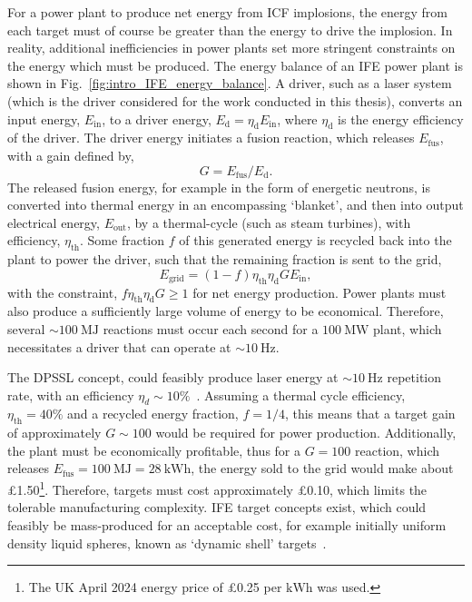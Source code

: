 For a power plant to produce net energy from \ac{ICF} implosions, the energy from each target must of course be greater than the energy to drive the implosion.
In reality, additional inefficiencies in power plants set more stringent constraints on the energy which must be produced.
The energy balance of an \ac{IFE} power plant is shown in Fig.~\ref{fig:intro_IFE_energy_balance}.
A driver, such as a laser system (which is the driver considered for the work conducted in this thesis), converts an input energy, $E_{\text{in}}$, to a driver energy, $E_{\text{d}} = \eta_{\text{d}}E_{\text{in}}$, where $\eta_{\text{d}}$ is the energy efficiency of the driver.
The driver energy initiates a fusion reaction, which releases $E_{\text{fus}}$, with a gain defined by,
\begin{equation}
    G = E_{\text{fus}}/E_{\text{d}}.
\end{equation}
The released fusion energy, for example in the form of energetic neutrons, is converted into thermal energy in an encompassing `blanket', and then into output electrical energy, $E_\text{out}$, by a thermal-cycle (such as steam turbines), with efficiency, $\eta_{\text{th}}$.
Some fraction $f$ of this generated energy is recycled back into the plant to power the driver, such that the remaining fraction is sent to the grid,
\begin{equation}
    E_{\text{grid}} = (1-f) \eta_{\text{th}} \eta_{\text{d}} G E_{\text{in}},
\end{equation}
with the constraint, $f \eta_{\text{th}} \eta_{\text{d}} G \geq 1$ for net energy production.
Power plants must also produce a sufficiently large volume of energy to be economical.
Therefore, several $\sim100\ \text{MJ}$ reactions must occur each second for a $100\ \text{MW}$ plant, which necessitates a driver that can operate at $\sim10\ \text{Hz}$.

The \ac{DPSSL} concept, could feasibly produce laser energy at $\sim10\ \text{Hz}$ repetition rate, with an efficiency $\eta_d\sim10\%$~\cite{banerjee_dipole_2015,batani_future_2023}.
Assuming a thermal cycle efficiency, $\eta_{\text{th}}=40\%$ and a recycled energy fraction, $f=1/4$, this means that a target gain of approximately $G\sim100$ would be required for power production.
Additionally, the plant must be economically profitable, thus for a $G=100$ reaction, which releases $E_{\text{fus}} = 100\ \text{MJ} = 28\ \text{kWh}$, the energy sold to the grid would make about £1.50\footnote{The UK April 2024 energy price of £0.25 per $\text{kWh}$ was used.}.
Therefore, targets must cost approximately £0.10, which limits the tolerable manufacturing complexity.
\ac{IFE} target concepts exist, which could feasibly be mass-produced for an acceptable cost, for example initially uniform density liquid spheres, known as `dynamic shell' targets~\cite{goncharov_novel_2020,igumenshchev_proofprinciple_2023}.

